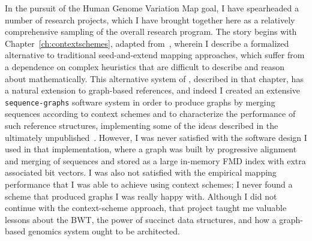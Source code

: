 In the pursuit of the Human Genome Variation Map goal, I have spearheaded a number of research projects, which I have brought together here as a relatively comprehensive sampling of the overall research program. The story begins with Chapter~\ref{ch:contextschemes}, adapted from~\citet{novak2015canonical}, wherein I describe a formalized alternative to traditional seed-and-extend mapping approaches, which suffer from a dependence on complex heuristics that are difficult to describe and reason about mathematically. This alternative system of , described in that chapter, has a natural extension to graph-based references, and indeed I created an extensive \texttt{sequence-graphs} software system in order to produce graphs by merging sequences according to context schemes and to characterize the performance of such reference structures, implementing some of the ideas described in the ultimately unpublished~\citet{paten2014mapping}. However, I was never satisfied with the software design I used in that implementation, where a graph was built by progressive alignment and merging of sequences and stored as a large in-memory FMD index with extra associated bit vectors. I was also not satisfied with the empirical mapping performance that I was able to achieve using context schemes; I never found a scheme that produced graphs I was really happy with. Although I did not continue with the context-scheme approach, that project taught me valuable lessons about the BWT, the power of succinct data structures, and how a graph-based genomics system ought to be architected.



